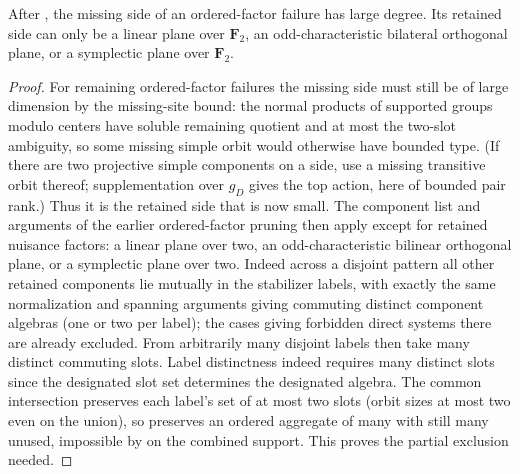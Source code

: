 \begin{lemma}
\label{fb:nuisance-planes}
After , the missing side of an ordered-factor
failure has large degree.  Its retained side can only be a linear plane over
\(\mathbf F_2\), an odd-characteristic bilateral orthogonal plane, or a
symplectic plane over \(\mathbf F_2\).
\end{lemma}
\begin{proof}

For remaining ordered-factor failures the missing side must still be of large dimension by the missing-site bound: the normal products of supported groups modulo centers have soluble remaining quotient and at most the two-slot ambiguity, so some missing simple orbit would otherwise have bounded type. (If there are two projective simple components on a side, use a missing transitive orbit thereof; supplementation over \(g_D\) gives the top action, here of bounded pair rank.) Thus it is the retained side that is now small. The component list and arguments of the earlier ordered-factor pruning then apply except for retained nuisance factors: a linear plane over two, an odd-characteristic bilinear orthogonal plane, or a symplectic plane over two. Indeed across a disjoint pattern all other retained components lie mutually in the stabilizer labels, with exactly the same normalization and spanning arguments giving commuting distinct component algebras (one or two per label); the cases giving forbidden direct systems there are already excluded. From arbitrarily many disjoint labels then take many distinct commuting slots. Label distinctness indeed requires many distinct slots since the designated slot set determines the designated algebra. The common intersection preserves each label's set of at most two slots (orbit sizes at most two even on the union), so preserves an ordered aggregate of many with still many unused, impossible by  on the combined support. This proves the partial exclusion needed.

\end{proof}

